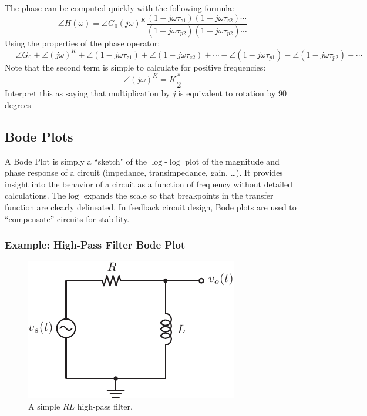 The phase can be computed quickly with the following formula:
%
\begin{equation}
 \angle H(\omega ) =  \angle {G_0}{(j\omega )^K}\frac{{(1 - j\omega {\tau _{z1}})(1 - j\omega {\tau _{z2}}) \cdots }}{{(1 - j\omega {\tau _{p2}})(1 - j\omega {\tau _{p2}}) \cdots }}
\end{equation}
Using the properties of the phase operator:
\begin{equation}
   =  \angle {G_0} +  \angle {(j\omega )^K} +  \angle (1 - j\omega {\tau _{z1}}) +  \angle (1 - j\omega {\tau _{z2}}) +  \cdots 
   -  \angle (1 - j\omega {\tau _{p1}}) -  \angle (1 - j\omega {\tau _{p2}}) -  \cdots 
\end{equation}
Note that the second term is simple to calculate for positive frequencies:
\begin{equation}
 \angle {(j\omega )^K} = K\frac{\pi }{2}
\end{equation}
%
Interpret this as saying that multiplication by \textit{j} is equivalent to rotation by 90 degrees



\subsection{Bode Plots}


A Bode Plot is simply a ``sketch" of the $\log$-$\log$ plot of the magnitude and phase response of a circuit (impedance, transimpedance, gain, …).  It provides insight into the behavior of a circuit as a function of frequency without detailed calculations.  The$\log$ expands the scale so that breakpoints in the transfer function are clearly delineated.  In feedback circuit design, Bode plots are used to “compensate” circuits for stability.
 



\subsubsection{Example: High-Pass Filter Bode Plot}

\begin{figure}[tb]
\begin{center}
\includegraphics[angle=-0.0,width=.4\columnwidth]{mod1_3_8_rl_hpf}
\end{center}
\caption{A simple $RL$ high-pass filter.} \label{fig:hpf}
\end{figure}

